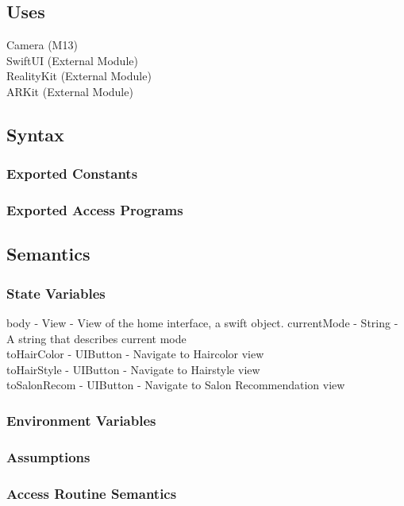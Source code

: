 \documentclass[12pt, titlepage]{article}
\begin{document}
\subsection{Uses}
Camera (M13) \\
SwiftUI (External Module) \\
RealityKit (External Module) \\
ARKit (External Module) \\

\subsection{Syntax}

\subsubsection{Exported Constants}
\subsubsection{Exported Access Programs}

\subsection{Semantics}

\subsubsection{State Variables}
body - View - View of the home interface, a swift object.
currentMode - String - A string that describes current mode \\
toHairColor - UIButton - Navigate to Haircolor view\\
toHairStyle - UIButton - Navigate to Hairstyle view\\
toSalonRecom - UIButton - Navigate to Salon Recommendation view\\

\subsubsection{Environment Variables}

\subsubsection{Assumptions}

\subsubsection{Access Routine Semantics}
\end{document}
